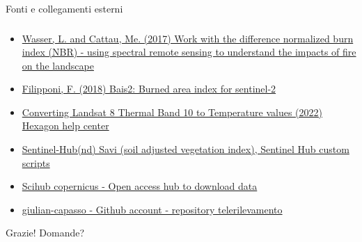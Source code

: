 \documentclass{beamer}  %
\begin{document}
\begin{frame}{Fonti e collegamenti esterni }
\frametitle{}
\begin{itemize}
\small 
\item \href{https://www.earthdatascience.org/courses/earth-analytics/multispectral-remote-sensing-modis/normalized-burn-index-dNBR/}{\scriptsize Wasser, L. and Cattau, Me. (2017) Work with the difference normalized burn index (NBR) - using spectral remote sensing to understand the impacts of fire on the landscape}
\item \href{https://www.mdpi.com/2504-3900/2/7/364}{\scriptsize Filipponi, F. (2018) Bais2: Burned area index for sentinel-2}
 \item \href{https://supportsi.hexagon.com/s/article/Converting-Landsat-8-Thermal-Band-10-to-Temperature-values?language=en_US}{\scriptsize Converting Landsat 8 Thermal Band 10 to Temperature values (2022) Hexagon help center}
\item \href{https://custom-scripts.sentinel-hub.com/custom-scripts/sentinel-2/savi/}{\scriptsize Sentinel-Hub(nd) Savi (soil adjusted vegetation index), Sentinel Hub custom scripts}
\item \href{https://scihub.copernicus.eu/dhus/#/home}{\scriptsize Scihub copernicus - Open access hub to download data}
\item \href{https://github.com/giulian-capasso/telerilevamento}{ \scriptsize giulian-capasso - Github account - repository telerilevamento}
\end{itemize}

\vspace{1.5cm}
\begin{center}
\scriptsize Grazie! 
Domande? 
\end{center}
\end{frame}
\end{document}
